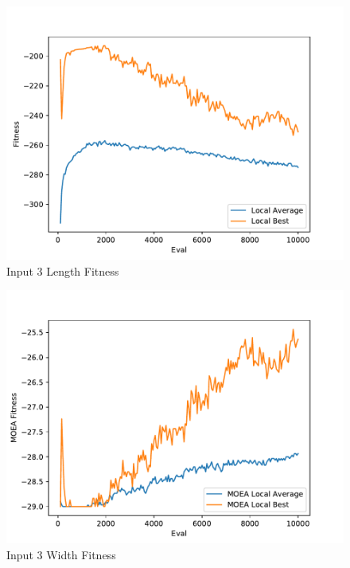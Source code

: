 \documentclass{standalone}
\begin{document}
\begin{figure}[!htb]
	\caption{Input 3 Length Fitness}
	\label{fig:graph_3003}
	\includegraphics[width=\textwidth]{../graphs/graphs/3003.pdf}
\end{figure}


\begin{figure}[!htb]
	\caption{Input 3 Width Fitness}
	\label{fig:graph_3003_moea}
	\includegraphics[width=\textwidth]{../graphs/graphs/3003_moea.pdf}
\end{figure}
\end{document}
